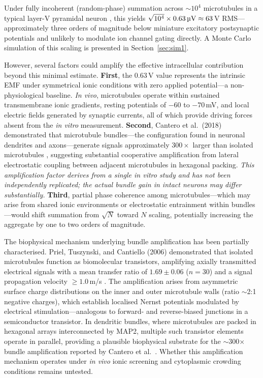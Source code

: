\documentclass[10pt, a4paper, twocolumn]{article}
\begin{document}
Under fully incoherent (random-phase) summation across
$\sim\!10^4$ microtubules in a typical layer-V pyramidal
neuron \cite{hameroff2014}, this yields $\sqrt{10^4} \times 0.63\,
\text{\textmu V} \approx 63$\,\textmu V RMS---approximately
three orders of magnitude below miniature excitatory
postsynaptic potentials and unlikely to modulate ion
channel gating directly. A Monte Carlo simulation of
this scaling is presented in Section~\ref{sec:sim1}.

However, several factors could amplify the effective
intracellular contribution beyond this minimal estimate.
\textbf{First}, the 0.63\,\textmu V value represents the
intrinsic EMF under symmetrical ionic conditions with
zero applied potential---a non-physiological baseline.
\emph{In vivo}, microtubules operate within sustained
transmembrane ionic gradients, resting potentials of
$-60$ to $-70$\,mV, and local electric fields generated
by synaptic currents, all of which provide driving forces
absent from the \emph{in vitro} measurement.
\textbf{Second}, Cantero et al.\ (2018) demonstrated that
microtubule bundles---the configuration found in neuronal
dendrites and axons---generate signals approximately
$300\times$ larger than isolated microtubules
\cite{cantero2018}, suggesting substantial cooperative
amplification from lateral electrostatic coupling between
adjacent microtubules in hexagonal packing.
\emph{This amplification factor derives from a single
\emph{in vitro} study and has not been independently
replicated; the actual bundle gain in intact neurons
may differ substantially.}
\textbf{Third}, partial phase coherence among
microtubules---which may arise from shared ionic
environments or electrostatic entrainment within
bundles---would shift summation from $\sqrt{N}$ toward
$N$ scaling, potentially increasing the aggregate by
one to two orders of magnitude.

The biophysical mechanism underlying bundle amplification has been
partially characterised. Priel, Tuszynski, and Cantiello (2006)
demonstrated that isolated microtubules function as biomolecular
transistors, amplifying axially transmitted electrical signals
with a mean transfer ratio of $1.69 \pm 0.06$ ($n = 30$) and a
signal propagation velocity $\geq 1.0$\,m/s \cite{priel2006}.
The amplification arises from asymmetric surface charge
distributions on the inner and outer microtubule walls (ratio
$\sim$2:1 negative charges), which establish localised Nernst
potentials modulated by electrical stimulation---analogous to
forward- and reverse-biased junctions in a semiconductor
transistor. In dendritic bundles, where microtubules are packed
in hexagonal arrays interconnected by MAP2, multiple such
transistor elements operate in parallel, providing a plausible
biophysical substrate for the $\sim$300$\times$ bundle
amplification reported by Cantero et al.\ \cite{cantero2018}.
Whether this amplification mechanism operates under \emph{in vivo}
ionic screening and cytoplasmic crowding conditions remains
untested.
\end{document}
